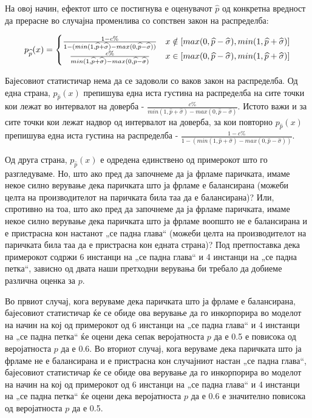 \documentclass[12pt]{article}
\numberwithin{equation}{section}
\begin{document}
На овој начин, ефектот што се постигнува е оценувачот \(\widehat{p}\) од конкретна вредност да прерасне во случајна променлива со сопствен закон на распределба:

\[p_{\widehat{p}}(x) = \begin{cases}
    \frac{1 - c\%}{1 - (min(1, \widehat{p} + \widehat{\sigma}) - max(0, \widehat{p} - \widehat{\sigma}))} & x \notin [max(0, \widehat{p} - \widehat{\sigma}), min(1, \widehat{p} + \widehat{\sigma})] \\
    \hfil \frac{c\%}{min(1, \widehat{p} + \widehat{\sigma}) - max(0, \widehat{p} - \widehat{\sigma})} & x \in [max(0, \widehat{p} - \widehat{\sigma}), min(1, \widehat{p} + \widehat{\sigma})]
\end{cases}\]

Бајесовиот статистичар нема да се задоволи со ваков закон на распределба. Од една страна, \(p_{\widehat{p}}(x)\) препишува една иста густина на распределба на сите точки кои лежат во интервалот на доверба - \(\frac{c\%}{min(1, \widehat{p} + \widehat{\sigma}) - max(0, \widehat{p} - \widehat{\sigma})}\). Истото важи и за сите точки кои лежат надвор од интервалот на доверба, за кои повторно \(p_{\widehat{p}}(x)\) препишува една иста густина на распределба - \(\frac{1 - c\%}{1 - (min(1, \widehat{p} + \widehat{\sigma}) - max(0, \widehat{p} - \widehat{\sigma}))}\).

Од друга страна, \(p_{\widehat{p}}(x)\) е одредена единствено од примерокот што го разгледуваме. Но, што ако пред да започнеме да ја фрламе паричката, имаме некое силно верување дека паричката што ја фрламе е балансирана (можеби целта на производителот на паричката била таа да е балансирана)? Или, спротивно на тоа, што ако пред да започнеме да ја фрламе паричката, имаме некое силно верување дека паричката што ја фрламе воопшто не е балансирана и е пристрасна кон настанот „се падна глава“ (можеби целта на производителот на паричката била таа да е пристрасна кон едната страна)? Под претпоставка дека примерокот содржи 6 инстанци на „се падна глава“ и 4 инстанци на „се падна петка“, зависно од двата наши претходни верувања би требало да добиеме различна оценка за \(p\).

Во првиот случај, кога веруваме дека паричката што ја фрламе е балансирана, бајесовиот статистичар ќе се обиде ова верување да го инкорпорира во моделот на начин на кој од примерокот од 6 инстанци на „се падна глава“ и 4 инстанци на „се падна петка“ ќе оцени дека сепак веројатноста \(p\) да е 0.5 е повисока од веројатноста \(p\) да е 0.6. Во вториот случај, кога веруваме дека паричката што ја фрламе не е балансирана и е пристрасна кон случајниот настан „се падна глава“, бајесовиот статистичар ќе се обиде ова верување да го инкорпорира во моделот на начин на кој од примерокот од 6 инстанци на „се падна глава“ и 4 инстанци на „се падна петка“ ќе оцени дека веројатноста \(p\) да е 0.6 е значително повисока од веројатноста \(p\) да е 0.5.
\end{document}
